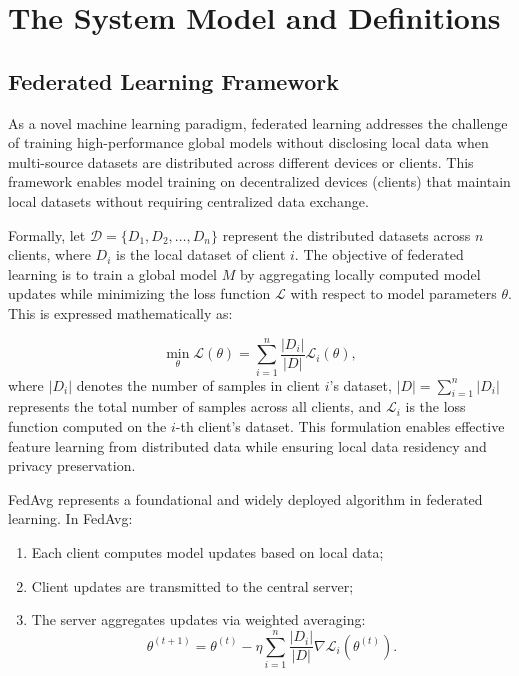 \documentclass[journal,twoside,web]{ieeecolor}
\begin{document}
\section{The System Model and Definitions}
\subsection{Federated Learning Framework}

As a novel machine learning paradigm, federated learning addresses the challenge of training high-performance global models without disclosing local data when multi-source datasets are distributed across different devices or clients. This framework enables model training on decentralized devices (clients) that maintain local datasets without requiring centralized data exchange.

Formally, let $\mathcal{D} = \{D_1, D_2, \ldots, D_n\}$ represent the distributed datasets across $n$ clients, where $D_i$ is the local dataset of client $i$. The objective of federated learning is to train a global model $M$ by aggregating locally computed model updates while minimizing the loss function $\mathcal{L}$ with respect to model parameters $\theta$. This is expressed mathematically as:

\begin{equation}
\min_{\theta} \mathcal{L}(\theta) = \sum_{i=1}^{n} \frac{|D_i|}{|D|} \mathcal{L}_i (\theta),
\label{eq:fl_objective}
\end{equation}
where $|D_i|$ denotes the number of samples in client $i$'s dataset, $|D| = \sum_{i=1}^n |D_i|$ represents the total number of samples across all clients, and $\mathcal{L}_i$ is the loss function computed on the $i$-th client's dataset. This formulation enables effective feature learning from distributed data while ensuring local data residency and privacy preservation.

FedAvg\cite{fedavg} represents a foundational and widely deployed algorithm in federated learning. In FedAvg:
\begin{enumerate}
    \item Each client computes model updates based on local data;
    \item Client updates are transmitted to the central server;
    \item The server aggregates updates via weighted averaging:
    \begin{equation}
    \theta^{(t+1)} = \theta^{(t)} - \eta \sum_{i=1}^{n} \frac{|D_i|}{|D|} \nabla \mathcal{L}_i (\theta^{(t)}).
    \label{eq:fedavg}
    \end{equation}
\end{enumerate}
\end{document}
